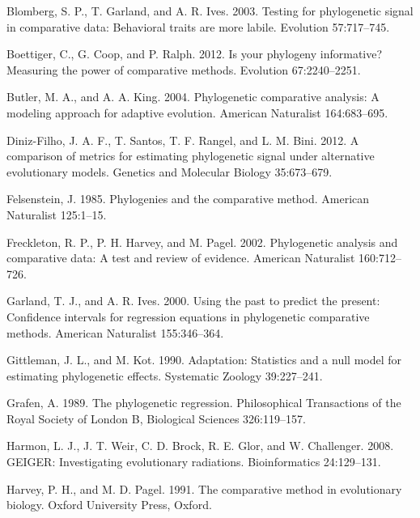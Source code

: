 \documentclass[
]{article}
\begin{document}
\leavevmode\hypertarget{ref-Blomberg_et_al2003}{}%
Blomberg, S. P., T. Garland, and A. R. Ives. 2003. Testing for
phylogenetic signal in comparative data: Behavioral traits are more
labile. Evolution 57:717--745.

\leavevmode\hypertarget{ref-Boettiger_et_al2012}{}%
Boettiger, C., G. Coop, and P. Ralph. 2012. Is your phylogeny
informative? Measuring the power of comparative methods. Evolution
67:2240--2251.

\leavevmode\hypertarget{ref-ButlerKing2004}{}%
Butler, M. A., and A. A. King. 2004. Phylogenetic comparative analysis:
A modeling approach for adaptive evolution. American Naturalist
164:683--695.

\leavevmode\hypertarget{ref-DinizFilho2012}{}%
Diniz-Filho, J. A. F., T. Santos, T. F. Rangel, and L. M. Bini. 2012. A
comparison of metrics for estimating phylogenetic signal under
alternative evolutionary models. Genetics and Molecular Biology
35:673--679.

\leavevmode\hypertarget{ref-Felsenstein1985}{}%
Felsenstein, J. 1985. Phylogenies and the comparative method. American
Naturalist 125:1--15.

\leavevmode\hypertarget{ref-Freckleton_et_al2002}{}%
Freckleton, R. P., P. H. Harvey, and M. Pagel. 2002. Phylogenetic
analysis and comparative data: A test and review of evidence. American
Naturalist 160:712--726.

\leavevmode\hypertarget{ref-GarlandIves2000}{}%
Garland, T. J., and A. R. Ives. 2000. Using the past to predict the
present: Confidence intervals for regression equations in phylogenetic
comparative methods. American Naturalist 155:346--364.

\leavevmode\hypertarget{ref-Gittleman1990}{}%
Gittleman, J. L., and M. Kot. 1990. Adaptation: Statistics and a null
model for estimating phylogenetic effects. Systematic Zoology
39:227--241.

\leavevmode\hypertarget{ref-Grafen1989}{}%
Grafen, A. 1989. The phylogenetic regression. Philosophical Transactions
of the Royal Society of London B, Biological Sciences 326:119--157.

\leavevmode\hypertarget{ref-Harmon2008}{}%
Harmon, L. J., J. T. Weir, C. D. Brock, R. E. Glor, and W. Challenger.
2008. GEIGER: Investigating evolutionary radiations. Bioinformatics
24:129--131.

\leavevmode\hypertarget{ref-HarveyPagel1991}{}%
Harvey, P. H., and M. D. Pagel. 1991. The comparative method in
evolutionary biology. Oxford University Press, Oxford.
\end{document}

